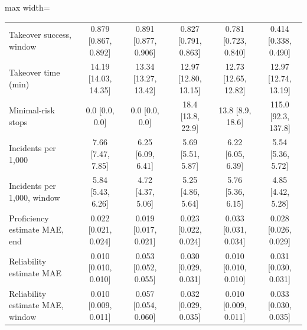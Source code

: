 \documentclass[utf8]{frontiers_suppmat}
\begin{document}
\begin{table}[!htbp]
\begin{adjustbox}{max width=\textwidth}
\begin{tabular}{@{}lccccc@{}}
Takeover success, window & 0.879 [0.867, 0.892] & 0.891 [0.877, 0.906] & 0.827 [0.791, 0.863] & 0.781 [0.723, 0.840] & 0.414 [0.338, 0.490]\\
Takeover time (min) & 14.19 [14.03, 14.35] & 13.34 [13.27, 13.42] & 12.97 [12.80, 13.15] & 12.73 [12.65, 12.82] & 12.97 [12.74, 13.19]\\
Minimal-risk stops & 0.0 [0.0, 0.0] & 0.0 [0.0, 0.0] & 18.4 [13.8, 22.9] & 13.8 [8.9, 18.6] & 115.0 [92.3, 137.8]\\
Incidents per 1,000 & 7.66 [7.47, 7.85] & 6.25 [6.09, 6.41] & 5.69 [5.51, 5.87] & 6.22 [6.05, 6.39] & 5.54 [5.36, 5.72]\\
Incidents per 1,000, window & 5.84 [5.43, 6.26] & 4.72 [4.37, 5.06] & 5.25 [4.86, 5.64] & 5.76 [5.36, 6.15] & 4.85 [4.42, 5.28]\\
Proficiency estimate MAE, end & 0.022 [0.021, 0.024] & 0.019 [0.017, 0.021] & 0.023 [0.022, 0.024] & 0.033 [0.031, 0.034] & 0.028 [0.026, 0.029]\\
Reliability estimate MAE & 0.010 [0.010, 0.010] & 0.053 [0.052, 0.055] & 0.030 [0.029, 0.031] & 0.010 [0.010, 0.010] & 0.031 [0.030, 0.031]\\
Reliability estimate MAE, window & 0.010 [0.009, 0.011] & 0.057 [0.054, 0.060] & 0.032 [0.029, 0.035] & 0.010 [0.009, 0.011] & 0.033 [0.030, 0.035]\\
		\bottomrule
	\end{tabular}
	\end{adjustbox}
\end{table}
\end{document}

